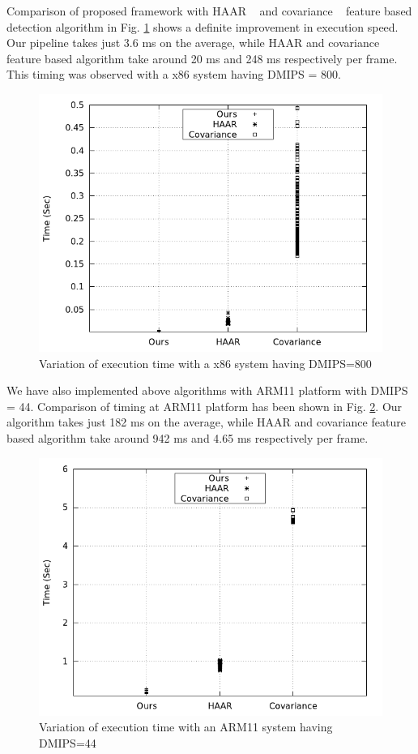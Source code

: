 \documentclass[conference]{IEEEtran}
\begin{document}
\indent Comparison of proposed framework with HAAR ~\cite{2} and covariance
~\cite{19} feature based detection algorithm in Fig.
\ref{pipeline_execution_time} shows a definite improvement in execution
speed. Our pipeline takes just 3.6 ms on the average, while HAAR and
covariance feature based algorithm take around 20 ms and 248 ms
respectively per frame. This timing was observed with a x86 system
having DMIPS = 800.

\begin{figure}[!h]
\centering
\includegraphics[scale=0.30]{figures/pipeline_execution_time}
\caption{Variation of execution time with a x86 system
having DMIPS=800}
\label{pipeline_execution_time}
\end{figure}

\indent We have also implemented above algorithms with ARM11 platform
with DMIPS = 44.  Comparison of timing at ARM11 platform has been shown
in Fig.  \ref{arm11_pipeline_execution_time}. Our algorithm takes just
182 ms on the average, while HAAR and covariance feature based algorithm
take around 942 ms and 4.65 ms respectively per frame. 

\begin{figure}[!h]
\centering
\includegraphics[scale=0.30]{figures/arm11_pipeline_execution_time}
\caption{Variation of execution time with an ARM11 system
having DMIPS=44}
\label{arm11_pipeline_execution_time}
\end{figure}
\end{document}

